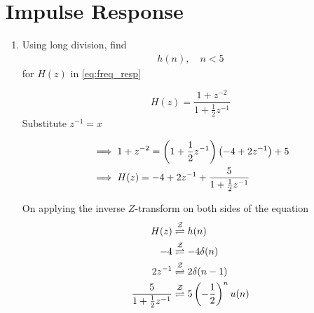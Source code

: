 \documentclass[journal,12pt,twocolumn]{IEEEtran}
\renewcommand\thesection{\arabic{section}}
\begin{document}
\section{Impulse Response}
\begin{enumerate}[label=\thesection.\arabic*]
  \item Using long division, find
	\begin{align}
		h(n), \quad n < 5
	\end{align}
	for $H(z)$ in \eqref{eq:freq_resp}
	
	\solution 
  \begin{equation}
		H(z) = \frac{1 + z^{-2}}{1 + \frac12 z^{-1}}
	\end{equation}
	Substitute $z^{-1} = x$
	
	
	\begin{align}
		&\implies 1 + z^{-2} = \left(1 + \frac12 z^{-1}\right)\left(-4 + 2z^{-1}\right) + 5 \\
		&\implies H(z) = -4 + 2z^{-1} + \frac{5}{1 + \frac12 z^{-1}}
	\end{align}
	
	On applying the inverse $Z$-transform on both sides of the equation
	\begin{align}
		H(z) &\overset{\mathcal{Z}}{ \rightleftharpoons} h(n) \\
		-4 &\overset{\mathcal{Z}}{ \rightleftharpoons} -4\delta(n) \\
		2z^{-1} &\overset{\mathcal{Z}}{ \rightleftharpoons} 2\delta(n - 1) \\
		\frac{5}{1 + \frac12 z^{-1}} &\overset{\mathcal{Z}}{ \rightleftharpoons} 5\left(-\frac12\right)^n u(n) \\
	\end{align}
	

\end{enumerate}
\end{document}
